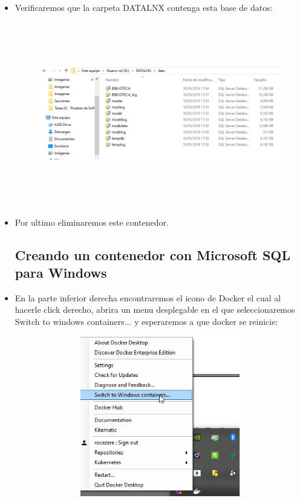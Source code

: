 \begin{itemize}
	\item Verificaremos que la carpeta DATALNX contenga esta base de datos:\\
	
	\begin{figure}[htb]
	\begin{center}
	\includegraphics[width=19cm, height=8cm]{./Imagenes/datal}
	\end{center}
	\end{figure}
	
	\item Por ultimo eliminaremos este contenedor.\\
	\clearpage
	
	
	\subsection{Creando un contenedor con Microsoft SQL para Windows}
	
	\item En la parte inferior derecha encontraremos el icono de Docker el cual al hacerle click derecho, abrira un menu desplegable en el que seleccionaremos Switch to windows containers... y esperaremos a que docker se reinicie:\\
	
	\begin{figure}[htb]
	\begin{center}
	\includegraphics[width=17cm, height=7cm]{./Imagenes/winco}
	\end{center}
	\end{figure}
	

\end{itemize}
